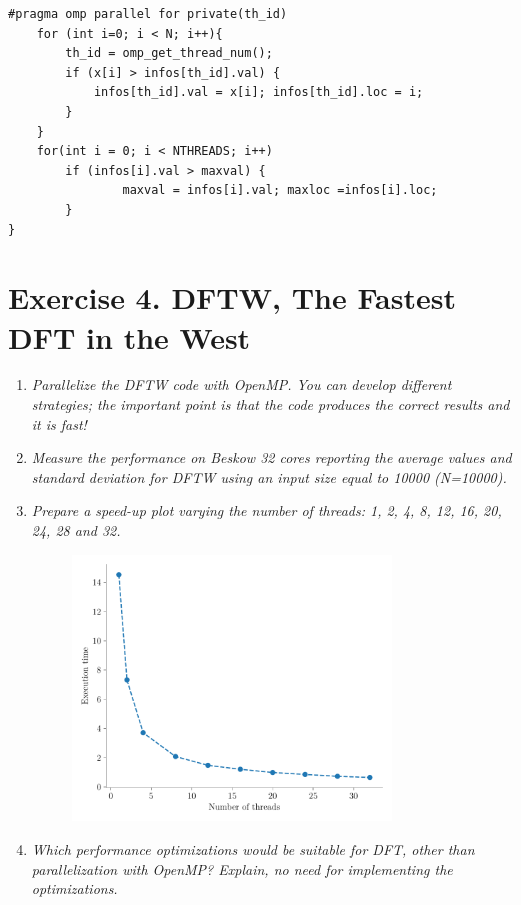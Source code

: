 \documentclass[12pt]{article}
\begin{document}
\begin{enumerate}
\begin{lstlisting}[style=CStyle]
	#pragma omp parallel for private(th_id)
	for (int i=0; i < N; i++){
		th_id = omp_get_thread_num();
		if (x[i] > infos[th_id].val) {
			infos[th_id].val = x[i]; infos[th_id].loc = i;
		}
	}
	for(int i = 0; i < NTHREADS; i++)
		if (infos[i].val > maxval) {
				maxval = infos[i].val; maxloc =infos[i].loc;
		}
}
    \end{lstlisting}
\end{enumerate}
\section{Exercise 4. DFTW, The Fastest DFT in the West}
\begin{enumerate}
    \item \textit{Parallelize the DFTW code with OpenMP. You can develop different strategies; the important point is that the code produces the correct results and it is fast!}
    \item \textit{Measure the performance on Beskow 32 cores reporting the average values and standard deviation for DFTW using an input size equal to 10000 (N=10000).}
    \item \textit{Prepare a speed-up plot varying the number of threads: 1, 2, 4, 8, 12, 16, 20, 24, 28 and 32.}
    \begin{figure}[H]
    \centering
	\includegraphics[width=0.8\textwidth]{dftw.pdf}
	\end{figure}
    \item \textit{Which performance optimizations would be suitable for DFT, other than parallelization with OpenMP? Explain, no need for implementing the optimizations.}
\end{enumerate}
\end{document}
